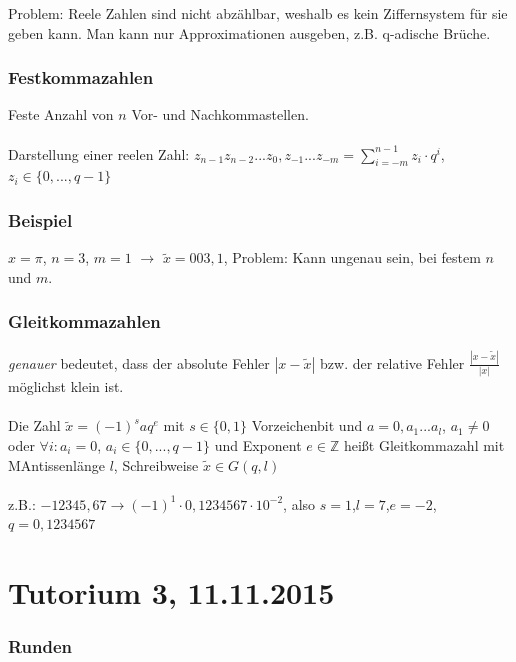 \documentclass{llncs}
\begin{document}
Problem: Reele Zahlen sind nicht abz\"ahlbar, weshalb es kein Ziffernsystem f\"ur sie geben kann. Man kann nur Approximationen ausgeben, z.B. q-adische Br\"uche.

\subsection*{Festkommazahlen}

Feste Anzahl von $n$ Vor- und Nachkommastellen.\\
\\
Darstellung einer reelen Zahl: $z_{n-1}z_{n-2}...z_{0},z_{-1}...z_{-m} = \sum_{i=-m}^{n-1} z_i \cdot q^{i}$, $z_i \in \{0,...,q-1\}$

\subsection*{Beispiel}

$x = \pi$, $n=3$, $m=1$ $\rightarrow$ $\tilde{x} = 003,1$, Problem: Kann ungenau sein, bei festem $n$ und $m$.

\subsection*{Gleitkommazahlen}

\textit{genauer} bedeutet, dass der absolute Fehler $| x - \tilde{x} |$ bzw. der relative Fehler $\frac{| x - \tilde{x} |}{|x|}$ möglichst klein ist.\\
\\
Die Zahl $\tilde{x} = (-1)^{s}aq^{e}$ mit $s \in \{0,1\}$ Vorzeichenbit und $a=0,a_{1}...a_{l}$, $a_1 \neq 0$ oder $\forall i: a_{i} = 0$, $a_i \in \{0,...,q-1\}$ und Exponent $e \in \mathbb{Z}$ heißt Gleitkommazahl mit MAntissenl\"ange $l$, Schreibweise $\tilde{x} \in G(q,l)$\\
\\
z.B.: $-12345,67 \longrightarrow (-1)^1 \cdot 0,1234567 \cdot 10^{-2}$, also $s=1$,$l=7$,$e=-2$, $q=0,1234567$

\chapter*{Tutorium 3, 11.11.2015}

\subsection*{Runden}
\end{document}
